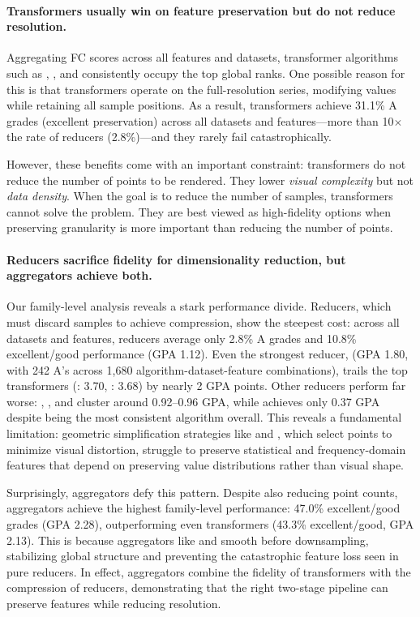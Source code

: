 \paragraph{\textbf{Transformers usually win on feature preservation but do not reduce resolution.}}
Aggregating FC scores across all features and datasets, transformer algorithms such as \methodGau, \methodMean, and \methodSG consistently occupy the top global ranks. One possible reason for this is that transformers operate on the full-resolution series, modifying values while retaining all sample positions. As a result, transformers achieve 31.1\% A grades (excellent preservation) across all datasets and features---more than 10$\times$ the rate of reducers (2.8\%)---and they rarely fail catastrophically.

However, these benefits come with an important constraint: transformers do not reduce the number of points to be rendered. They lower \emph{visual complexity} but not \emph{data density}. When the goal is to reduce the number of samples, transformers cannot solve the problem. They are best viewed as high-fidelity options when preserving granularity is more important than reducing the number of points.

\paragraph{\textbf{Reducers sacrifice fidelity for dimensionality reduction, but aggregators achieve both.}}
Our family-level analysis reveals a stark performance divide. Reducers, which must discard samples to achieve compression, show the steepest cost: across all datasets and features, reducers average only 2.8\% A grades and 10.8\% excellent/good performance (GPA 1.12). Even the strongest reducer, \methodFPCS (GPA 1.80, with 242 A's across 1,680 algorithm-dataset-feature combinations), trails the top transformers (\methodGau: 3.70, \methodMean: 3.68) by nearly 2 GPA points. Other reducers perform far worse: \methodLTTB, , and \methodMinMaxLTTB cluster around 0.92--0.96 GPA, while \methodDP achieves only 0.37 GPA despite being the most consistent algorithm overall. This reveals a fundamental limitation: geometric simplification strategies like \methodDP and \methodLTTB, which select points to minimize visual distortion, struggle to preserve statistical and frequency-domain features that depend on preserving value distributions rather than visual shape.

Surprisingly, aggregators defy this pattern. Despite also reducing point counts, aggregators achieve the highest family-level performance: 47.0\% excellent/good grades (GPA 2.28), outperforming even transformers (43.3\% excellent/good, GPA 2.13). This is because aggregators like \methodPAA and \methodASAP smooth before downsampling, stabilizing global structure and preventing the catastrophic feature loss seen in pure reducers. In effect, aggregators combine the fidelity of transformers with the compression of reducers, demonstrating that the right two-stage pipeline can preserve features while reducing resolution.

